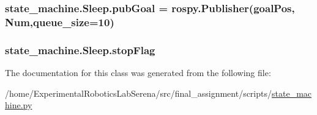 \subsubsection[{\texorpdfstring{pub\+Goal}{pubGoal}}]{\setlength{\rightskip}{0pt plus 5cm}state\+\_\+machine.\+Sleep.\+pub\+Goal = rospy.\+Publisher(\textquotesingle{}goal\+Pos\textquotesingle{}, Num,queue\+\_\+size=10)\hspace{0.3cm}{\ttfamily [static]}}\hypertarget{classstate__machine_1_1Sleep_aaaa470bd53002152ac5b2d3d4ad20c9d}{}\label{classstate__machine_1_1Sleep_aaaa470bd53002152ac5b2d3d4ad20c9d}
\subsubsection[{\texorpdfstring{stop\+Flag}{stopFlag}}]{\setlength{\rightskip}{0pt plus 5cm}state\+\_\+machine.\+Sleep.\+stop\+Flag\hspace{0.3cm}{\ttfamily [static]}}\hypertarget{classstate__machine_1_1Sleep_a00b879885a7e1f565d91faba0403513d}{}\label{classstate__machine_1_1Sleep_a00b879885a7e1f565d91faba0403513d}


The documentation for this class was generated from the following file\+:\begin{DoxyCompactItemize}
\item 
/home/\+Experimental\+Robotics\+Lab\+Serena/src/final\+\_\+assignment/scripts/\hyperlink{state__machine_8py}{state\+\_\+machine.\+py}\end{DoxyCompactItemize}
